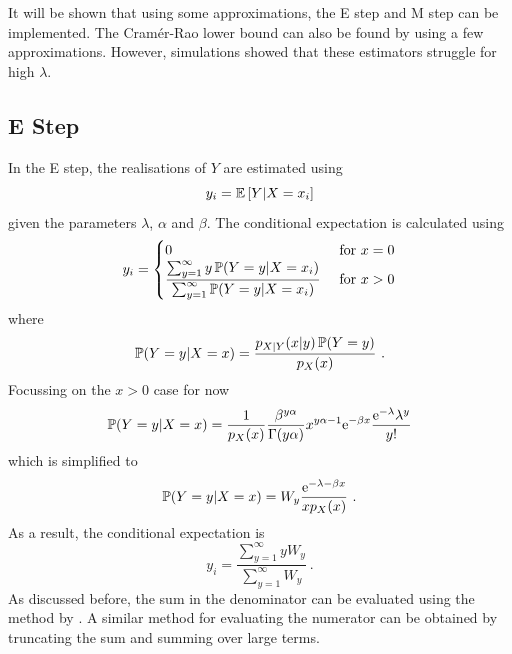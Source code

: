 It will be shown that using some approximations, the E step and M step can be implemented. The Cram\'er-Rao lower bound \citep{rao1945information, cramer1946mathematical} can also be found by using a few approximations. However, simulations showed that these estimators struggle for high $\lambda$.

\subsection{E Step}

In the E step, the realisations of $Y$ are estimated using
\begin{equation}
  y_i =
  \operatorname{\mathbb{E}}\left[
    Y|X=x_i
  \right]
\end{equation}
given the parameters $\lambda$, $\alpha$ and $\beta$. The conditional expectation is calculated using
\begin{equation}
  y_i = 
  \begin{cases}
    0 & \text{ for } x=0 \\ 
    \dfrac{\sum_{y=1}^\infty y \operatorname{\mathbb{P}}(Y=y|X=x_i)}{\sum_{y=1}^\infty \operatorname{\mathbb{P}}(Y=y|X=x_i)} & \text{ for } x>0
  \end{cases}
\end{equation}
where
\begin{equation*}
  \operatorname{\mathbb{P}}(Y=y|X=x) = \frac{p_{X|Y}(x|y)\operatorname{\mathbb{P}}(Y=y)}{p_X(x)}
  \ .
\end{equation*}
Focussing on the $x>0$ case for now
\begin{equation*}
  \operatorname{\mathbb{P}}(Y=y|X=x) = \frac{1}{p_X(x)}\frac{\beta^{y\alpha}}{\Gamma(y\alpha)}x^{y\alpha-1}\mathrm{e}^{-\beta x}\frac{\mathrm{e}^{-\lambda}\lambda^y}{y!}
\end{equation*}
which is simplified to
\begin{equation}
  \operatorname{\mathbb{P}}(Y=y|X=x) = W_y \frac{\mathrm{e}^{-\lambda-\beta x}}{x p_X(x)} \ .
\end{equation}
As a result, the conditional expectation is
\begin{equation}
  y_i = \frac{\sum_{y=1}^\infty y W_y}{\sum_{y=1}^\infty W_y}
  \ .
\end{equation}
As discussed before, the sum in the denominator can be evaluated using the method by \cite{dunn2005series}. A similar method for evaluating the numerator can be obtained by truncating the sum and summing over large terms.

